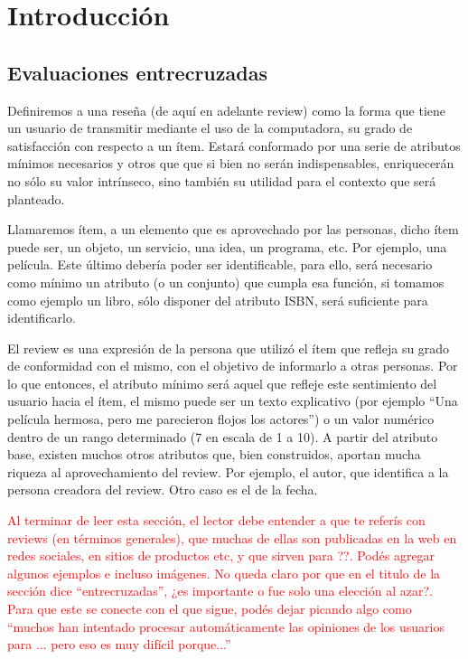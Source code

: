\chapter{Introducción}
\label{chapter:introduccion}

\section{Evaluaciones entrecruzadas}
\label{section:evaluaciones-cruzadas}
Definiremos a una reseña (de aquí en adelante review) como la forma que tiene un usuario de transmitir mediante el uso de la computadora, su grado de satisfacción con respecto a un ítem. Estará conformado por una serie de atributos mínimos necesarios y otros que que si bien no serán indispensables, enriquecerán no sólo su valor intrínseco, sino también su utilidad para el contexto que será planteado.

Llamaremos ítem, a un elemento que es aprovechado por las personas, dicho ítem puede ser, un objeto, un servicio, una idea, un programa, etc.  Por ejemplo, una película. Este último debería poder ser identificable, para ello, será necesario como mínimo un atributo (o un conjunto) que cumpla esa función,  si tomamos como ejemplo un libro, sólo disponer del atributo ISBN, será suficiente para identificarlo.

El review es una expresión de la persona que utilizó el ítem que refleja su grado de conformidad con el mismo, con el objetivo de informarlo a otras personas. Por lo que entonces, el atributo mínimo será aquel que refleje este sentimiento del usuario hacia el ítem, el mismo puede ser un texto explicativo (por ejemplo ``Una película hermosa, pero me parecieron flojos los actores'') o un valor numérico dentro de un rango determinado (7 en escala de 1 a 10). A partir del atributo base, existen muchos otros atributos que, bien construidos, aportan mucha riqueza al aprovechamiento del review. Por ejemplo, el autor, que identifica a la persona creadora del review. Otro caso es el de la fecha.

\begin{framed}
\textcolor{red}{Al terminar de leer esta sección, el lector debe entender a que te referís con reviews (en términos generales), que muchas de ellas son publicadas en la web en redes sociales, en sitios de productos etc, y que sirven para ??. Podés agregar algunos ejemplos e incluso imágenes. No queda claro por que en el titulo de la sección dice ``entrecruzadas'', ¿es importante o fue solo una elección al azar?. Para que este se conecte con el que sigue, podés dejar picando algo como ``muchos han intentado procesar automáticamente las opiniones de los usuarios para ... pero eso es muy difícil porque...'' }
\end{framed}

